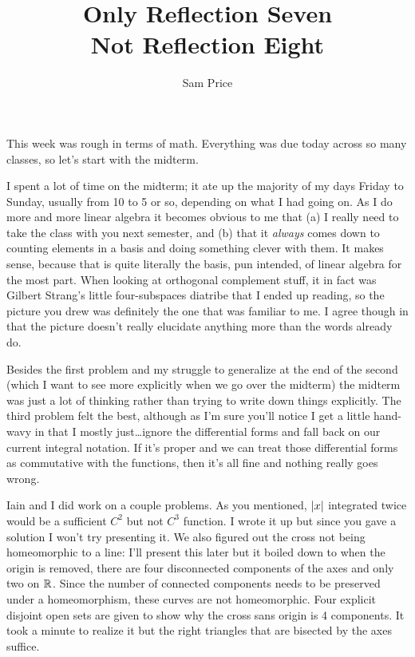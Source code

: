 \documentclass[12pt]{article}
\author{Sam Price}
\title{Only Reflection Seven\\\Large{Not Reflection Eight}}
\begin{document}
\maketitle

This week was rough in terms of math.
Everything was due today across so many classes, so let's start with the midterm.

I spent a lot of time on the midterm; it ate up the majority of my days Friday to Sunday,
usually from 10 to 5 or so, depending on what I had going on.
As I do more and more linear algebra it becomes obvious to me that
(a) I really need to take the class with you next semester, and
(b) that it \emph{always} comes down to counting elements in a basis
and doing something clever with them. It makes sense, because that is quite literally the basis,
pun intended, of linear algebra for the most part.
When looking at orthogonal complement stuff, it in fact was Gilbert Strang's
little four-subspaces diatribe that I ended up reading, so the picture you drew was definitely
the one that was familiar to me. I agree though in that the picture doesn't really elucidate
anything more than the words already do.

Besides the first problem and my struggle to generalize at the end of the second
(which I want to see more explicitly when we go over the midterm)
the midterm was just a lot of thinking rather than trying to write down things explicitly.
The third problem felt the best, although as I'm sure you'll notice I get a little hand-wavy
in that I mostly just\ldots ignore the differential forms
and fall back on our current integral notation.
If it's proper and we can treat those differential forms as commutative with the functions,
then it's all fine and nothing really goes wrong.

Iain and I did work on a couple problems.
As you mentioned, $\lvert x\rvert$ integrated twice would be a sufficient $C^{2}$
but not $C^{3}$ function.
I wrote it up but since you gave a solution I won't try presenting it.
We also figured out the cross not being homeomorphic to a line:
I'll present this later but it boiled down to when the origin is removed,
there are four disconnected components of the axes and only two on $\mathbb{R}^{}$.
Since the number of connected components needs to be preserved under a homeomorphism,
these curves are not homeomorphic. Four explicit disjoint open sets are given to show why
the cross sans origin is 4 components. It took a minute to realize it but the
right triangles that are bisected by the axes suffice.
\end{document}
